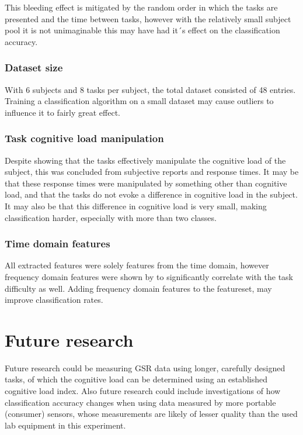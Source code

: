\documentclass[11pt,leqno,a4paper]{report} %
\begin{document}
This bleeding effect is mitigated by the random order in which the tasks are presented and the time between tasks, however with the relatively small subject pool it is not unimaginable this may have had it´s effect on the classification accuracy.


\subsubsection{Dataset size}
With 6 subjects and 8 tasks per subject, the total dataset consisted of 48 entries. Training a classification algorithm on a small dataset may cause outliers to influence it to fairly great effect.

\subsubsection{Task cognitive load manipulation}
Despite \citet{Nourbakhsh2013} showing that the tasks effectively manipulate the cognitive load of the subject, this was concluded from subjective reports and response times. It may be that these response times were manipulated by something other than cognitive load, and that the tasks do not evoke a difference in cognitive load in the subject. It may also be that this difference in cognitive load is very small, making classification harder, especially with more than two classes.

\subsubsection{Time domain features}
All extracted features were solely features from the time domain, however frequency domain features were shown by \citep{Nourbakhsh2012} to significantly correlate with the task difficulty as well. Adding frequency domain features to the featureset, may improve classification rates.

\section{Future research}
Future research could be measuring GSR data using longer, carefully designed tasks, of which the cognitive load can be determined using an established cognitive load index.
Also future research could include investigations of how classification accuracy changes when using data measured by more portable (consumer) sensors, whose measurements are likely of lesser quality than the used lab equipment in this experiment. 
\end{document}
